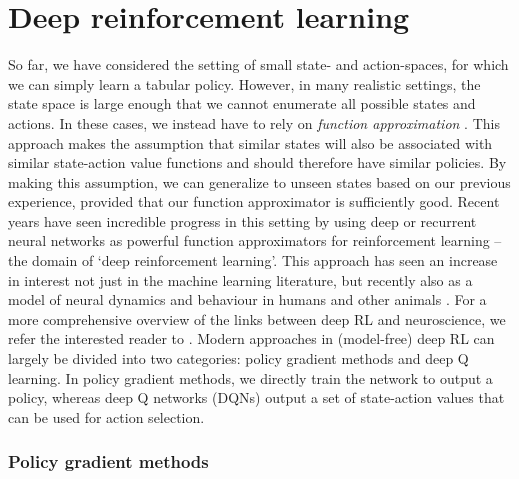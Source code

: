 \section{Deep reinforcement learning}
\label{sec:deep_RL}

So far, we have considered the setting of small state- and action-spaces, for which we can simply learn a tabular policy.
However, in many realistic settings, the state space is large enough that we cannot enumerate all possible states and actions.
In these cases, we instead have to rely on \emph{function approximation} \citep{sutton2018reinforcement}.
This approach makes the assumption that similar states will also be associated with similar state-action value functions and should therefore have similar policies.
By making this assumption, we can generalize to unseen states based on our previous experience, provided that our function approximator is sufficiently good.
Recent years have seen incredible progress in this setting by using deep or recurrent neural networks as powerful function approximators for reinforcement learning -- the domain of `deep reinforcement learning'.
This approach has seen an increase in interest not just in the machine learning literature, but recently also as a model of neural dynamics and behaviour in humans and other animals \citep{wang2018prefrontal, jensen2023recurrent, makino2023arithmetic, merel2019deep, banino2018vector}.
For a more comprehensive overview of the links between deep RL and neuroscience, we refer the interested reader to \citet{botvinick2020deep}.
Modern approaches in (model-free) deep RL can largely be divided into two categories: policy gradient methods and deep Q learning.
In policy gradient methods, we directly train the network to output a policy, whereas deep Q networks (DQNs) output a set of state-action values that can be used for action selection.

\subsubsection*{Policy gradient methods}

